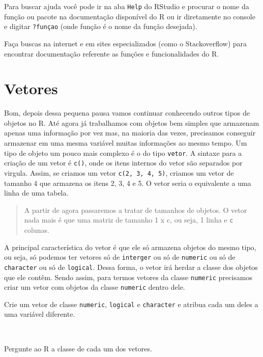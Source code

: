 \documentclass[]{book}
\theoremstyle{definition}
\theoremstyle{definition}
\theoremstyle{definition}
\theoremstyle{remark}
\let\BeginKnitrBlock\begin \let\EndKnitrBlock\end
\begin{document}
Para buscar ajuda você pode ir na aba \texttt{Help} do RStudio e procurar o nome da função ou pacote na documentação disponível do R ou ir diretamente no console e digitar \texttt{?funçao} (onde função é o nome da função desejada).

Faça buscas na internet e em sites especializados (como o Stackoverflow) para encontrar documentação referente as funções e funcionalidades do R.

\hypertarget{vetores}{%
\section{Vetores}\label{vetores}}

Bom, depois dessa pequena pausa vamos continuar conhecendo outros tipos de objetos no R. Até agora já trabalhamos com objetos bem simples que armazenam apenas uma informação por vez mas, na maioria das vezes, precisamos conseguir armazenar em uma mesma variável muitas informações ao mesmo tempo. Um tipo de objeto um pouco mais complexo é o do tipo \texttt{vetor}. A sintaxe para a criação de um vetor é \texttt{c()}, onde os itens internos do vetor são separados por virgula. Assim, se criamos um vetor \texttt{c(2,\ 3,\ 4,\ 5)}, criamos um vetor de tamanho 4 que armazena os itens 2, 3, 4 e 5. O vetor seria o equivalente a uma linha de uma tabela.

\begin{quote}
A partir de agora passaremos a tratar de tamanhos de objetos. O vetor nada mais é que uma matriz de tamanho 1 x c, ou seja, 1 linha e \texttt{c} colunas.
\end{quote}

A principal característica do vetor é que ele só armazena objetos do mesmo tipo, ou seja, só podemos ter vetores só de \texttt{interger} ou só de \texttt{numeric} ou só de \texttt{character} ou só de \texttt{logical}. Dessa forma, o vetor irá herdar a classe dos objetos que ele contêm. Sendo assim, para termos vetores da classe \texttt{numeric} precisamos criar um vetor com objetos da classe \texttt{numeric} dentro dele.

\BeginKnitrBlock{exercise}
\protect\hypertarget{exr:unnamed-chunk-19}{}{\label{exr:unnamed-chunk-19} }Crie um vetor de classe \texttt{numeric}, \texttt{logical} e \texttt{character} e atribua cada um deles a uma variável diferente.
\EndKnitrBlock{exercise}

~

\BeginKnitrBlock{exercise}
\protect\hypertarget{exr:unnamed-chunk-20}{}{\label{exr:unnamed-chunk-20} }Pergunte ao R a classe de cada um dos vetores.
\EndKnitrBlock{exercise}
\end{document}
